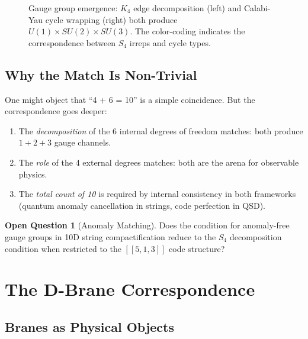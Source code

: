 \documentclass[11pt,a4paper]{article}
\theoremstyle{definition}
\newtheorem{question}[theorem]{Open Question}
\begin{document}
\begin{figure}[h]
\caption{Gauge group emergence: $K_4$ edge decomposition (left) and Calabi-Yau
cycle wrapping (right) both produce $U(1) \times SU(2) \times SU(3)$.  The
color-coding indicates the correspondence between $S_4$ irreps and cycle
types.}
\label{fig:gauge_correspondence}
\end{figure}

\subsection{Why the Match Is Non-Trivial}

One might object that ``4 + 6 = 10'' is a simple coincidence.  But the
correspondence goes deeper:
\begin{enumerate}[nosep]
    \item The \emph{decomposition} of the 6 internal degrees of freedom
          matches: both produce $1+2+3$ gauge channels.
    \item The \emph{role} of the 4 external degrees matches: both are the
          arena for observable physics.
    \item The \emph{total count of 10} is required by internal consistency
          in both frameworks (quantum anomaly cancellation in strings,
          code perfection in QSD).
\end{enumerate}

\begin{question}[Anomaly Matching]
Does the condition for anomaly-free gauge groups in 10D string compactification
reduce to the $S_4$ decomposition condition when restricted to the $[[5,1,3]]$
code structure?
\end{question}


\section{The D-Brane Correspondence}
\label{sec:branes}

\subsection{Branes as Physical Objects}
\end{document}
